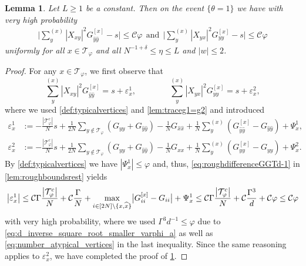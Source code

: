 \documentclass[10pt,a4paper]{amsart}
\newcommand{\abs}[1]{\left| #1 \right|}
\newcommand{\absb}[1]{\bigl| #1 \bigr|}
\newcommand{\eps}{\varepsilon}
\newtheorem{lemma}{Lemma}[section]
\numberwithin{equation}{section}
\newcommand*\bset[1]{[#1]}
\newcommand*\ubarr[1]{{\widehat{#1}}}
\newcommand{\nc}{\normalcolor}
\begin{document}
	\nc
	 
	
	\begin{lemma}\label{lem:restmoy-s}
		Let $L \ge 1$ be a constant. Then on the event $\{ \theta =1\}$ we have with very high probability 
		\begin{align*}
			\bigg|	\sum_{y}^{(x)} \abs{X_{xy}}^2 G_{\ubarr{y}\ubarr{y}}^{\bset{x}} -s \bigg|\le \mathcal C \varphi  ~~ \text{and}~~\bigg| \sum_{y}^{(x)} \abs{X_{yx}}^2 G_{yy}^{\bset{x}} -s \bigg| \le  \mathcal{C}\varphi 
		\end{align*}
		uniformly for all $x \in \mathcal T_{\varphi}$ and all $N^{-1+ \delta} \le \eta \le L$ and $ \abs{w} \le 2$. 

	\end{lemma}
	
 
	
	\begin{proof}
		For any $x \in \mathcal{T}_\varphi$, we first observe that 
		\begin{equation*}
			\sum_{y}^{(x)} \abs{X_{xy}}^2 G_{\ubarr{y}\ubarr{y}}^{\bset{x}} =s + \eps^1_x, \qquad \qquad \sum_{y}^{(x)} \abs{X_{yx}}^2 G_{yy}^{\bset{x}} =s + \eps^2_x,
		\end{equation*}
		where we used \cref{def:typicalvertices} and \cref{lem:traceg1=g2} and  introduced 
		\begin{align}
			\eps^1_x &:=-\frac{\abs{\mathcal{T}_{\varphi}^c}}{N} s + \frac{1}{2N} \sum_{y \notin \mathcal{T}_{\varphi}}\left( G_{yy} + G_{\ubarr{y}\ubarr{y}} \right) - \frac{1}{N} G_{\ubarr{x} \ubarr{x}} +\frac{1}{N} \sum_{y}^{(x)} \left(G_{\ubarr{y}\ubarr{y}}^{\bset{x}} - G_{\ubarr{y}\ubarr{y}}\right) + \Psi_{x}^1, \label{eq:defi_epsilon_1}\\
			\eps^2_x &:=-\frac{\abs{\mathcal{T}_{\varphi}^c}}{N} s + \frac{1}{2N} \sum_{y \notin \mathcal{T}_{\varphi}}\left( G_{yy} + G_{\ubarr{y}\ubarr{y}} \right) - \frac{1}{N} G_{xx} + \frac{1}{N} \sum_{y}^{(x)}  \left(G_{yy}^{\bset{x}} - G_{yy}\right) + \Psi_{x}^2.\label{eq:defi_epsilon_2}
		\end{align}
		By \cref{def:typicalvertices} we have $\abs{\Psi_x^1}\leq \varphi$ and, thus,  \eqref{eq:roughdifferenceGGTd-1} in \cref{lem:roughboundsrest} yields 
		\[ 
		\absb{\eps_{x}^1} \le \mathcal{C}  \Gamma \nc \frac{\abs{\mathcal{T}_{\varphi}^c}}{N}+ \mathcal{C}\frac{ \Gamma \nc }{N}   +  \max_{i \in [2N] \backslash\{x,\ubarr{x}\}}\absb{G_{ii}^{\bset{x}} - G_{ii}} + \Psi_{x}^1
		\le \mathcal{C} \Gamma \nc  \frac{\abs{\mathcal{T}_{\varphi}^c}}{N} +  \mathcal C \frac{\Gamma^3}{d} \nc + \mathcal{C} \varphi \leq \mathcal C \varphi
		\] 
		with very high probability, 
		where we used $\Gamma^3 d^{-1} \le \varphi$ due to \cref{eq:d_inverse_square_root_smaller_varphi_a} as well as \cref{eq:number_atypical_vertices} 
		in the last inequality.  
		Since the same reasoning applies to $\eps_{x}^2$, we have completed the proof of \cref{lem:restmoy-s}.  
	\end{proof}
	
\end{document}
